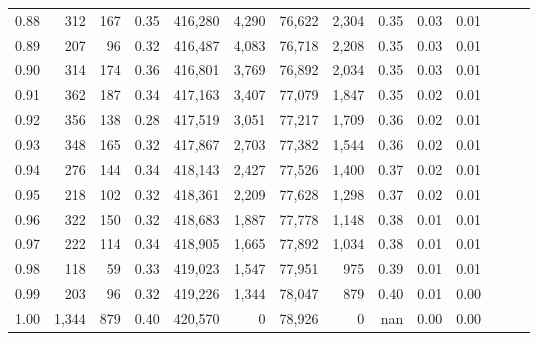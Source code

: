 \begin{tabular}{rrrrrrrrrrrrrr}
0.88 &     312 &    167 &  0.35 &  416,280 &    4,290 &  76,622 &   2,304 &  0.35 &  0.03 &      0.01 \\
0.89 &     207 &     96 &  0.32 &  416,487 &    4,083 &  76,718 &   2,208 &  0.35 &  0.03 &      0.01 \\
0.90 &     314 &    174 &  0.36 &  416,801 &    3,769 &  76,892 &   2,034 &  0.35 &  0.03 &      0.01 \\
0.91 &     362 &    187 &  0.34 &  417,163 &    3,407 &  77,079 &   1,847 &  0.35 &  0.02 &      0.01 \\
0.92 &     356 &    138 &  0.28 &  417,519 &    3,051 &  77,217 &   1,709 &  0.36 &  0.02 &      0.01 \\
0.93 &     348 &    165 &  0.32 &  417,867 &    2,703 &  77,382 &   1,544 &  0.36 &  0.02 &      0.01 \\
0.94 &     276 &    144 &  0.34 &  418,143 &    2,427 &  77,526 &   1,400 &  0.37 &  0.02 &      0.01 \\
0.95 &     218 &    102 &  0.32 &  418,361 &    2,209 &  77,628 &   1,298 &  0.37 &  0.02 &      0.01 \\
0.96 &     322 &    150 &  0.32 &  418,683 &    1,887 &  77,778 &   1,148 &  0.38 &  0.01 &      0.01 \\
0.97 &     222 &    114 &  0.34 &  418,905 &    1,665 &  77,892 &   1,034 &  0.38 &  0.01 &      0.01 \\
0.98 &     118 &     59 &  0.33 &  419,023 &    1,547 &  77,951 &     975 &  0.39 &  0.01 &      0.01 \\
0.99 &     203 &     96 &  0.32 &  419,226 &    1,344 &  78,047 &     879 &  0.40 &  0.01 &      0.00 \\
1.00 &   1,344 &    879 &  0.40 &  420,570 &        0 &  78,926 &       0 &   nan &  0.00 &      0.00 \\
\bottomrule
\end{tabular}
